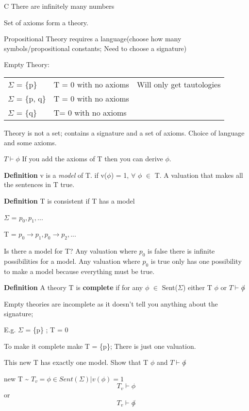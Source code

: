 \documentclass[11pt]{article}
\begin{document}
C There are infinitely many numbers

Set of axioms form a theory.

Propositional Theory requires a language(choose how many symbols/propositional constants; Need to choose a signature)

Empty Theory: 
\begin{center}
\begin{tabular}{lll}
\(\Sigma\) = \{p\} & T = 0 with no axioms & Will only get tautologies\\
\(\Sigma\) = \{p, q\} & T = 0 with no axioms\\
\(\Sigma\) = \{q\} & T= 0 with no axioms\\
\end{tabular}
\end{center}


Theory is not a set; contains a signature and a set of axioms. Choice of language and some axioms.

\(T \vdash \phi\) If you add the axioms of T then you can derive \(\phi\).

\textbf{Definition} v is a \emph{model} of T. if v(\(\phi\)) = 1, \(\forall\) \(\phi\) \(\in\) T. 
A valuation that makes all the sentences in T true.

\textbf{Definition} T is consistent if T has a model

\(\Sigma\) = \({ p_0,p_1,... }\)

T = \({ p_0\rightarrow p_1, p_0\rightarrow p_2, ... }\)

Is there a model for T? Any valuation where \(p_0\) is false there is infinite possibilities for a model.
Any valuation where \(p_0\) is true only has one possibility to make a model because everything must be true.

\textbf{Definition} A theory T is \textbf{complete} if for any \(\phi\) \(\in\) Sent(\(\Sigma\))
either T \vdash \(\phi\)  or \(T \vdash \not \phi\)

Empty theories are incomplete as it doesn't tell you anything about the signature;

E.g. \(\Sigma\) = \{p\} ; T = 0

To make it complete make T = \{p\}; There is just one valuation.

This new T has exactly one model. Show that T \vdash \(\phi\) and \(T \vdash \not \phi\)

new T \textasciitilde{} \(T_v = {\phi \in Sent(\Sigma)| v(\phi) = 1}\) 
\[T_v \vdash \phi\] or \[T_v \vdash \not \phi\]
\end{document}
